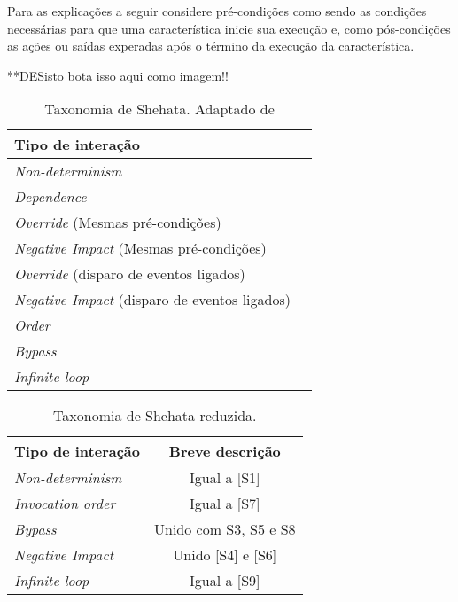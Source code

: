 Para as explicações a seguir considere pré-condições como sendo as condições necessárias para que uma característica inicie sua execução e, como pós-condições as ações ou saídas experadas após o término da execução da característica.

**DESisto bota isso aqui como imagem!!
\begin{table}[!htp] \centering
  \begin{tabular}{|l|c|}
    \hline
       {\bf Tipo de interação}\\
    \hline
       [S1]\textit{Non-determinism}\\
    \hline
       [S2]\textit{Dependence}\\
    \hline
       [S3]\textit{Override} (Mesmas pré-condições)\\
    \hline
       [S4]\textit{Negative Impact} (Mesmas pré-condições)\\
    \hline
       [S5]\textit{Override} (disparo de eventos ligados)\\
    \hline
       [S6]\textit{Negative Impact} (disparo de eventos ligados)\\
    \hline
       [S7]\textit{Order}\\
    \hline
       [S8]\textit{Bypass} \\
    \hline
       [S9]\textit{Infinite loop}\\
    \hline
  \end{tabular}
  \caption{Taxonomia de Shehata. Adaptado de \cite{NHLABATSI:2008}}
  \label{table:taxshehata}
\end{table}
\begin{table}[!htp] \centering
  \begin{tabular}{|l|c|}
    \hline
       {\bf Tipo de interação} & {\bf Breve descrição}\\
    \hline
       \textit{Non-determinism} & Igual a [S1]\\
    \hline
       \textit{Invocation order} & Igual a [S7]\\
    \hline
       \textit{Bypass} & Unido com S3, S5 e S8 \\
    \hline
       \textit{Negative Impact} & Unido [S4] e [S6]\\
    \hline
       \textit{Infinite loop} & Igual a [S9]\\
    \hline
  \end{tabular}
  \caption{Taxonomia de Shehata reduzida. \cite{NHLABATSI:2008}}
  \label{table:taxshehatared}
\end{table}

